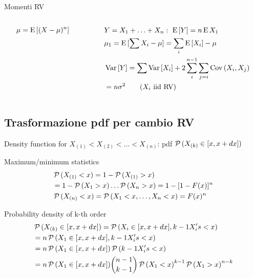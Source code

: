 \documentclass[asd-beamer.tex]{subfiles}
\begin{document}
\begin{frame}{Momenti RV}
\begin{columns}[T]\begin{column}{0.4\textwidth}
\begin{align*}
&\mu=\operatorname{E}{[(X-\mu)^n]}\\
&
\end{align*}
\end{column}\begin{column}{0.6\textwidth}

\begin{align*}
&Y=X_1+\ldots+X_n:\ \operatorname{E}{[Y]}=n\operatorname{E}{X_1}\\
&\mu_1=\operatorname{E}{[\sum X_i-\mu]}=\sum_i\operatorname{E}{[X_i]}-\mu\\
&\operatorname{Var}{[Y]}=\sum\operatorname{Var}{[X_i]}+2\sum_i^{n-1}\sum_{j=i}\operatorname{Cov}{(X_i,X_j)}\\
&=n\sigma^2\tag{$X_i$ iid RV}
\end{align*}
\end{column}\end{columns}
\end{frame}

\subsection{Trasformazione pdf per cambio RV}

\begin{frame}{Density function for }
$X_{(1)}<X_{(2)}<\ldots<X_{(n)}$: pdf $\operatorname{\mathcal{P}}{(X_{(k)}\in[x,x+dx])}$
\begin{block}{Maximum/minimum statistics}
\begin{align*}
&\operatorname{\mathcal{P}}{(X_{(1)}<x)}=1-\operatorname{\mathcal{P}}{(X_{(1)}>x)}\\
&=1-\operatorname{\mathcal{P}}{(X_1>x)}\ldots\operatorname{\mathcal{P}}{(X_n>x)}=1-[1-F(x)]^n\\
&\operatorname{\mathcal{P}}{(X_{(n)}<x)}=\operatorname{\mathcal{P}}{(X_1<x,\ldots,X_n<x)}=F(x)^n
\end{align*}
\end{block}
\begin{block}{Probability density of k-th order}
\begin{align*}
&\operatorname{\mathcal{P}}{(X_{(k)}\in[x,x+dx])}=\operatorname{\mathcal{P}}{(X_i\in[x,x+dx],k-1 X_i's<x)}\\
&=n\operatorname{\mathcal{P}}{(X_1\in[x,x+dx],k-1 X_i's<x)}\\
&=n\operatorname{\mathcal{P}}{(X_1\in[x,x+dx])}\operatorname{\mathcal{P}}{(k-1 X_i's<x)}\\
&=n\operatorname{\mathcal{P}}{(X_1\in[x,x+dx])}\binom{n-1}{k-1}\operatorname{\mathcal{P}}{(X_1<x)}^{k-1}\operatorname{\mathcal{P}}{(X_1>x)}^{n-k}
\end{align*}
\end{block}
\end{frame}
\end{document}

